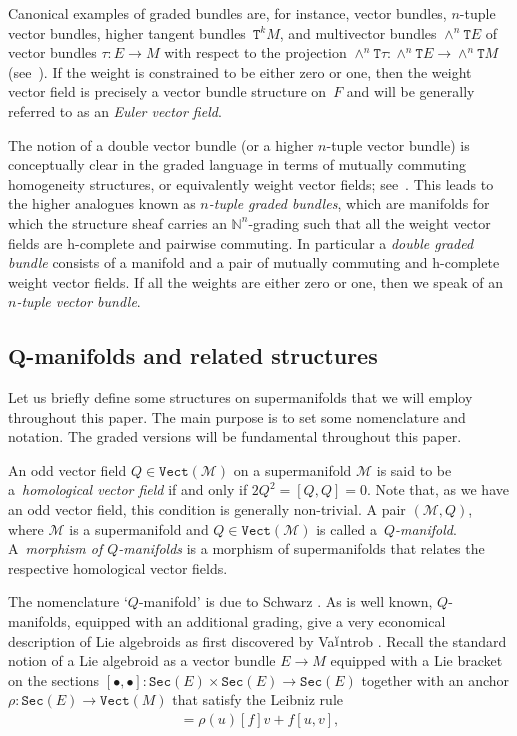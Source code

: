 \documentclass[pdftex]{sigma}
\def\Sec{\mathtt{Sec}}
\def\Vect{\mathtt{Vect}}
\def\sT{{\mathtt T}}
\numberwithin{equation}{section}
\begin{document}
Canonical examples of graded bundles are, for instance, vector bundles, $n$-tuple vector bundles, higher tangent bundles~$\sT^kM$, and multivector bundles $\wedge^n\sT E$ of vector bundles $\tau\colon E\to M$ with respect to the projection $\wedge^n\sT\tau\colon \wedge^n\sT E\to \wedge^n\sT M$ (see~\cite{Grabowska2014}).  If the weight is constrained to be either zero or one, then the weight vector f\/ield is precisely a  vector bundle structure on~$F$ and will be generally referred  to as an \emph{Euler vector field}.


The notion of a double vector bundle \cite{Pradines:1974} (or a higher $n$-tuple vector bundle)   is conceptually  clear in the graded language in terms of mutually commuting homogeneity structures, or equivalently weight vector f\/ields; see~\cite{Grabowski:2006,Grabowski2012}. This leads to the higher analogues known as \emph{$n$-tuple graded bundles}, which are  manifolds for which  the structure sheaf carries an $\mathbb{N}^{n}$-grading such that all the weight vector f\/ields are h-complete and pairwise commuting.  In particular a \emph{double graded bundle} consists of a manifold and a pair of mutually commuting and h-complete weight vector f\/ields. If all the weights are either zero or one, then we speak of an \emph{$n$-tuple vector bundle}.


\subsection[$Q$-manifolds and related structures]{$\boldsymbol{Q}$-manifolds and related structures}
Let us brief\/ly def\/ine some structures on supermanifolds that we will employ throughout this paper. The main purpose is to set some nomenclature and notation. The graded versions will be fundamental throughout this paper.

\begin{Definition}
An odd vector f\/ield $Q  \in \Vect(\mathcal{M})$ on a supermanifold $\mathcal{M}$ is said to be a~\emph{homological vector field}  if and only if $2 Q^{2} =  [Q,Q]=0$. Note that, as we have an odd vector f\/ield, this condition is generally non-trivial. A pair $(\mathcal{M},Q)$, where $\mathcal{M}$ is a supermanifold and $Q \in \Vect(\mathcal{M})$ is called a~\emph{$Q$-manifold}. A~\emph{morphism of $Q$-manifolds} is a morphism of supermanifolds that  relates the respective homological vector f\/ields.
\end{Definition}


The nomenclature `$Q$-manifold' is due to Schwarz \cite{Schwarz:1993}.  As is well known, $Q$-manifolds, equipped with an additional grading, give a very economical description of Lie algebroids as f\/irst discovered by  Va$\breve{\textrm{{\i}}}$ntrob \cite{Vaintrob:1997}. Recall the standard notion of a Lie algebroid as a vector bundle $E \rightarrow M$ equipped with a Lie bracket on the sections $[\bullet, \bullet]\colon  \Sec(E) \times \Sec(E) \rightarrow \Sec(E)$ together with an anchor $\rho\colon  \Sec(E) \rightarrow \Vect(M)$ that satisfy the Leibniz rule
\begin{gather*}
 [u,fv] = \rho(u)[f]   v  +   f [u,v],
\end{gather*}
\end{document}
